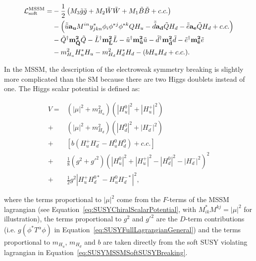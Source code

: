 \begin{equation}
\begin{split}
\lagrangian_\text{soft}^\text{MSSM} = & -\frac{1}{2}\left( M_3\tilde{g}\tilde{g} + M_2\tilde{W}\tilde{W} + M_1\tilde{B}\tilde{B} + c.c.\right) \\
& - \left( \tilde{\bar{u}}\mathbf{a_u} M^{in} y^{\ast}_{jkn} \phi_i \phi^{\ast j} \phi^{\ast k}{Q}H_u - \tilde{\bar{d}}\mathbf{a_d}\tilde{Q}H_d - \tilde{\bar{e}}\mathbf{a_e}\tilde{Q}H_d + c.c. \right) \\
& - \tilde{Q}^\dagger \mathbf{m_{\tilde{Q}}^2}\tilde{Q} - \tilde{L}^\dagger \mathbf{m_{\tilde{L}}^2}\tilde{L} - \tilde{u}^\dagger \mathbf{m_{\tilde{u}}^2}\tilde{u} - \tilde{d}^\dagger \mathbf{m_{\tilde{d}}^2}\tilde{d} - \tilde{e}^\dagger \mathbf{m_{\tilde{e}}^2}\tilde{e} \\
& - m^2_{H_u}H^{\ast}_u H_u - m^2_{H_d}H^{\ast}_d H_d - (bH_u H_d + c.c.).
\end{split}
\label{eq:SUSYMSSMSoftSUSYBreaking}
\end{equation}

In the MSSM, the description of the electroweak symmetry breaking is slightly more complicated than the SM because there are two Higgs doublets instead of one.
The Higgs scalar potential is defined as:

\begin{equation}
\begin{split}
V = & (|\mu|^2 + m_{H_u}^2)(|H_u^0|^2 + |H_u^+|^2) \\
+ & (|\mu|^2 + m_{H_d}^2)(|H_d^0|^2 + |H_d^-|^2) \\
+ & \left[b(H_u^+ H_d^- - H_u^0 H_d^0) + c.c. \right] \\
+ & \frac{1}{8}(g^2 + g'^2)(|H_u^0|^2 + |H_u^+|^2 - |H_d^0|^2 - |H_d^-|^2)^2 \\
+ & \frac{1}{2}g^2\left|H_u^+ H_d^{0\ast} - H_u^0 H_d^{-\ast}\right|^2,
\end{split}
\label{eq:SUSYMSSMScalarPotentialFull}
\end{equation}

\noindent where the terms proportional to $|\mu|^2$ come from the $F$-terms of the MSSM lagrangian (see Equation~\ref{eq:SUSYChiralScalarPotential}, with $M^{\ast}_{ik} M^{kj} = |\mu|^2$ for illustration), the terms proportional to $g^2$ and $g'^2$ are the $D$-term contributions (i.e. $g\left(\phi^{\ast}T^\alpha\phi\right)$ in Equation~\ref{eq:SUSYFullLagrangianGeneral}) and the terms proportional to $m_{H_u}$, $m_{H_d}$ and $b$ are taken directly from the soft SUSY violating lagrangian in Equation~\ref{eq:SUSYMSSMSoftSUSYBreaking}.


